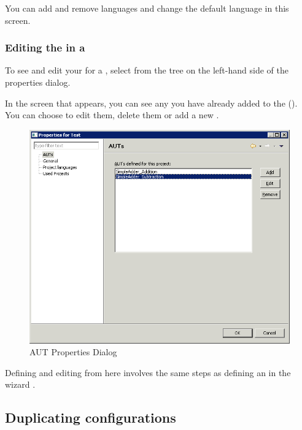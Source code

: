 You can add and remove \gdproject{} languages and change the default language in this screen. 
 


\subsubsection{Editing the \gdauts{} in a \gdproject{}}
\label{ProjPropertiesEditAUT}

To see and edit your \gdauts{} for a \gdproject{},  select  from the tree on the left-hand side of the \gdproject{} properties dialog. 

In the screen that appears, you can see any \gdauts{} you have already added to the \gdproject{} (). You can choose to edit them, delete them or add a new \gdaut{}. 

\begin{figure}[h]
\begin{center}
\includegraphics[width=12.5cm]{Tasks/Projects/PS/autsettingsdialog}
\caption{AUT Properties Dialog}
\label{autsettingsdialog}
\end{center}
\end{figure}

Defining and editing \gdauts{} from here involves the same steps as defining  an \gdaut{} in the \gdproject{} wizard . 

\subsection{Duplicating \gdaut{} configurations}


